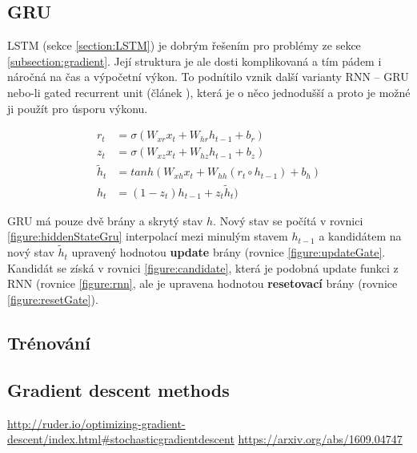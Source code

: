 \subsection{GRU}\label{section:GRU}
LSTM (sekce \ref{section:LSTM}) je dobrým řešením pro problémy ze sekce \ref{subsection:gradient}. Její struktura je ale dosti komplikovaná a tím pádem i náročná na čas a výpočetní výkon. To podnítilo vznik další varianty RNN -- GRU nebo-li gated recurrent unit (článek \cite{GRU}), která je o něco jednodušší a proto je možné ji použít pro úsporu výkonu.

\begin{align}    
    r_{t}&=\sigma(W_{xr}x_{t}+W_{hr}h_{t-1}+b_{r}) \label{figure:resetGate} \\
    z_{t}&=\sigma(W_{xz}x_{t}+W_{hz}h_{t-1}+b_{z}) \label{figure:updateGate} \\
    \tilde{h}_{t}&=tanh(W_{xh}x_t + W_{hh}(r_t \circ h_{t-1}) + b_h) \label{figure:candidate} \\
    h_{t}&=(1 - z_t)h_{t-1} + z_{t}\tilde{h}_{t}) \label{figure:hiddenStateGru}
\end{align}

GRU má pouze dvě brány a skrytý stav $h$. Nový stav se počítá v rovnici \ref{figure:hiddenStateGru} interpolací mezi minulým stavem $h_{t-1}$ a kandidátem na nový stav $\tilde{h}_{t}$ upravený hodnotou \textbf{update} brány (rovnice \ref{figure:updateGate}. Kandidát se získá v rovnici \ref{figure:candidate}, která je podobná update funkci z RNN (rovnice \ref{figure:rnn}, ale je upravena hodnotou \textbf{resetovací} brány (rovnice \ref{figure:resetGate}).


\subsection{Trénování}

\subsection{Gradient descent methods}
\url{http://ruder.io/optimizing-gradient-descent/index.html#stochasticgradientdescent}
\url{https://arxiv.org/abs/1609.04747}


